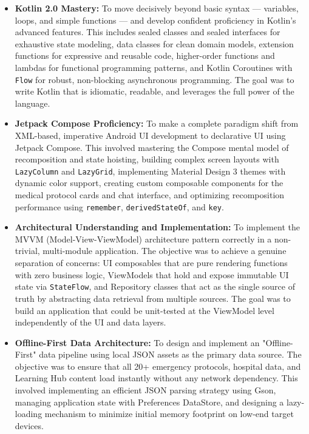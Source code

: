 \documentclass[12pt,a4paper]{report}
\begin{document}
\begin{itemize}
    \item \textbf{Kotlin 2.0 Mastery:} To move decisively beyond basic syntax — variables, loops, and simple functions — and develop confident proficiency in Kotlin's advanced features. This includes sealed classes and sealed interfaces for exhaustive state modeling, data classes for clean domain models, extension functions for expressive and reusable code, higher-order functions and lambdas for functional programming patterns, and Kotlin Coroutines with \texttt{Flow} for robust, non-blocking asynchronous programming. The goal was to write Kotlin that is idiomatic, readable, and leverages the full power of the language.

    \item \textbf{Jetpack Compose Proficiency:} To make a complete paradigm shift from XML-based, imperative Android UI development to declarative UI using Jetpack Compose. This involved mastering the Compose mental model of recomposition and state hoisting, building complex screen layouts with \texttt{LazyColumn} and \texttt{LazyGrid}, implementing Material Design 3 themes with dynamic color support, creating custom composable components for the medical protocol cards and chat interface, and optimizing recomposition performance using \texttt{remember}, \texttt{derivedStateOf}, and \texttt{key}.

    \item \textbf{Architectural Understanding and Implementation:} To implement the MVVM (Model-View-ViewModel) architecture pattern correctly in a non-trivial, multi-module application. The objective was to achieve a genuine separation of concerns: UI composables that are pure rendering functions with zero business logic, ViewModels that hold and expose immutable UI state via \texttt{StateFlow}, and Repository classes that act as the single source of truth by abstracting data retrieval from multiple sources. The goal was to build an application that could be unit-tested at the ViewModel level independently of the UI and data layers.

    \item \textbf{Offline-First Data Architecture:} To design and implement an "Offline-First" data pipeline using local JSON assets as the primary data source. The objective was to ensure that all 20+ emergency protocols, hospital data, and Learning Hub content load instantly without any network dependency. This involved implementing an efficient JSON parsing strategy using Gson, managing application state with Preferences DataStore, and designing a lazy-loading mechanism to minimize initial memory footprint on low-end target devices.


\end{itemize}
\end{document}
